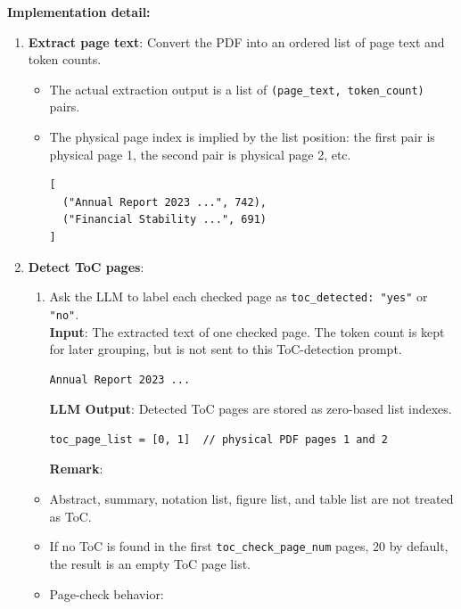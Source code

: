 \documentclass[11pt,a4paper]{article}
\newcommand{\fieldname}[1]{\textcolor{red!70!black}{\texttt{#1}}}
\begin{document}
\noindent\textbf{Implementation detail:}
\begin{enumerate}
    \item \textbf{Extract page text}: Convert the PDF into an ordered list of page text and token counts.
    \begin{itemize}
        \item The actual extraction output is a list of \texttt{(page\_text, token\_count)} pairs.
        \item The physical page index is implied by the list position: the first pair is physical page 1, the second pair is physical page 2, etc.

\begin{lstlisting}[style=pageTextBlockInList]
[
  ("Annual Report 2023 ...", 742),
  ("Financial Stability ...", 691)
]
\end{lstlisting}
    \end{itemize}

    \item \textbf{Detect ToC pages}: 
    \begin{enumerate}
    \item Ask the LLM to label each checked page as \texttt{toc\_detected: "yes"} or \texttt{"no"}.  \\
\textbf{Input}: The extracted text of one checked page. The token count is kept for later grouping, but is not sent to this ToC-detection prompt. \\
\begin{lstlisting}[style=pageTextBlockInList]
Annual Report 2023 ...
\end{lstlisting}
    \textbf{LLM Output}:  Detected ToC pages are stored as zero-based list indexes.
\begin{lstlisting}[style=pageTextBlockInList]
toc_page_list = [0, 1]  // physical PDF pages 1 and 2
\end{lstlisting}
    \textbf{Remark}:
    \end{enumerate}
\begin{itemize}
        \item Abstract, summary, notation list, figure list, and table list are not treated as ToC.
        \item If no ToC is found in the first \fieldname{toc\_check\_page\_num} pages, 20 by default, the result is an empty ToC page list.
        \item Page-check behavior:
        

\end{itemize}
\end{enumerate}
\end{document}
